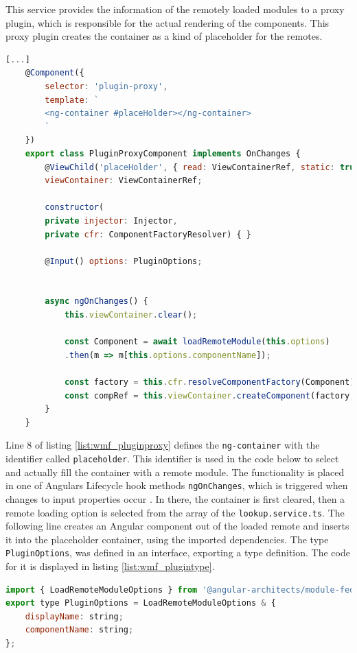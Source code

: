 This service provides the information of the remotely loaded modules to a proxy plugin, which is responsible for the actual rendering of the components. 
This proxy plugin creates the container as a kind of placeholder for the remotes. \cite{wmf_angular_dynamicfederation}

\begin{lstlisting}[language=JavaScript, caption=Content of \texttt{plugin-proxy.component.ts} for remote module loading in shell applications, label=list:wmf_pluginproxy,  xleftmargin=.0\textwidth, xrightmargin=.0\textwidth]
	[...]	
	@Component({
		selector: 'plugin-proxy',
		template: `
		<ng-container #placeHolder></ng-container>
		`
	})
	export class PluginProxyComponent implements OnChanges {
		@ViewChild('placeHolder', { read: ViewContainerRef, static: true })
		viewContainer: ViewContainerRef;
		
		constructor(
		private injector: Injector,
		private cfr: ComponentFactoryResolver) { }
		
		@Input() options: PluginOptions;
		
		
		async ngOnChanges() {
			this.viewContainer.clear();
			
			const Component = await loadRemoteModule(this.options)
			.then(m => m[this.options.componentName]);
			
			const factory = this.cfr.resolveComponentFactory(Component);
			const compRef = this.viewContainer.createComponent(factory, null, this.injector);		
		}
	}
\end{lstlisting}

Line 8 of listing \ref{list:wmf_pluginproxy} defines the \texttt{ng-container} with the identifier called \texttt{placeholder}. 
This identifier is used in the code below to select and actually fill the container with a remote module. 
The functionality is placed in one of Angulars Lifecycle hook methods \texttt{ngOnChanges}, which is triggered when changes to input properties occur \cite{wmf_angular_lifecyclehooks}.
In there, the container is first cleared, then a remote loading option is selected from the array of the \texttt{lookup.service.ts}. 
The following line creates an Angular component out of the loaded remote and inserts it into the placeholder container, using the imported dependencies.
The type \texttt{PluginOptions}, was defined in an interface, exporting a type definition. 
The code for it is displayed in listing \ref{list:wmf_plugintype}.

\begin{lstlisting}[language=JavaScript, caption=Content of \texttt{plugin.ts} for remote module loading in shell applications, label=list:wmf_plugintype,  xleftmargin=.0\textwidth, xrightmargin=.0\textwidth]
import { LoadRemoteModuleOptions } from '@angular-architects/module-federation';
export type PluginOptions = LoadRemoteModuleOptions & {
	displayName: string;
	componentName: string;
};
\end{lstlisting}

